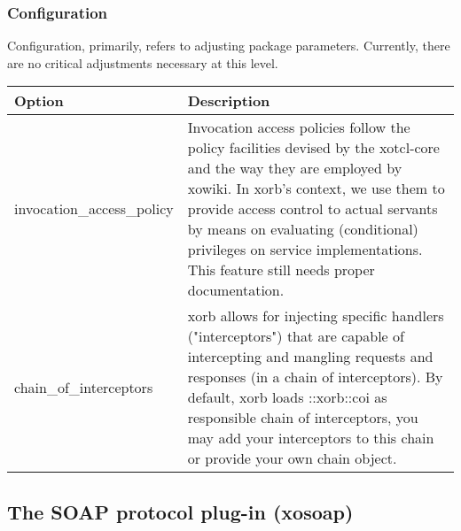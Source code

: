 	\subsubsection{Configuration}
	Configuration, primarily, refers to adjusting package parameters. Currently, there are no critical adjustments necessary at this level.   
	\begin{center}
	\begin{footnotesize}
\begin{longtable}{p{}p{}}
    \toprule
    Option & Description  \\ 
    \midrule
     invocation\_access\_policy & Invocation access policies follow the policy facilities devised by the xotcl-core and the way they are employed by xowiki. In xorb's context, we use them to provide access control to actual servants by means on evaluating (conditional) privileges on service implementations. This feature still needs proper documentation.\\
    chain\_of\_interceptors & xorb allows for injecting specific handlers ("interceptors") that are capable of intercepting and mangling requests and responses (in a chain of interceptors). By default, xorb loads ::xorb::coi as responsible chain of interceptors, you may add your interceptors to this chain or provide your own chain object. \\
    \bottomrule
\end{longtable}
\end{footnotesize}
\end{center}

	\subsection{The SOAP protocol plug-in (xosoap)}
